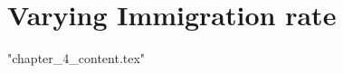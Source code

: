 %

\let\textcircled=\pgftextcircled
\chapter{Varying Immigration rate}
\label{chap:varying_immigration_rate}


{"chapter_4_content.tex"}

